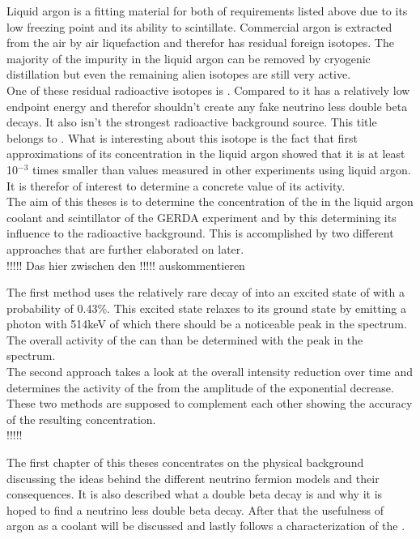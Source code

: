 Liquid argon is a fitting material for both of requirements listed above due to its low freezing point and its ability to scintillate. 
Commercial argon is extracted from the air by air liquefaction and therefor has residual foreign isotopes. 
The majority of the impurity in the liquid argon can be removed by cryogenic distillation but even the remaining alien isotopes are still very active.\\

One of these residual radioactive isotopes is \Kr. 
Compared to  it has a relatively low endpoint energy and therefor shouldn't create any fake neutrino less double beta decays. 
It also isn't the strongest radioactive background source. 
This title belongs to . 
What is interesting about this isotope is the fact that first approximations of its concentration in the liquid argon showed that it is at least 10\(^{-3}\) times smaller than values measured in other experiments using liquid argon.
It is therefor of interest to determine a concrete value of its activity. %
\\

The aim of this theses is to determine the concentration of the \Kr in the liquid argon coolant and scintillator of the GERDA experiment and by this determining its influence to the radioactive background. 
This is accomplished by two different approaches that are further elaborated on later. \\

!!!!! Das hier zwischen den !!!!! auskommentieren

The first method uses the relatively rare decay of \Kr into an excited state of  with a probability of 0.43\%. 
This excited state relaxes to its ground state by emitting a photon with 514keV of which there should be a noticeable peak in the spectrum. 
The overall activity of the \Kr can than be determined with the peak in the spectrum. 
\\

The second approach takes a look at the overall intensity reduction over time and determines the activity of the \Kr from the amplitude of the exponential decrease. 
These two methods are supposed to complement each other showing the accuracy of the resulting concentration.\\

!!!!!

The first chapter of this theses concentrates on the physical background discussing the ideas behind the different neutrino fermion models and their consequences. 
It is also described what a double beta decay is and why it is hoped to find a neutrino less double beta decay. 
After that the usefulness of argon as a coolant will be discussed and lastly follows a characterization of the \Kr.\\

